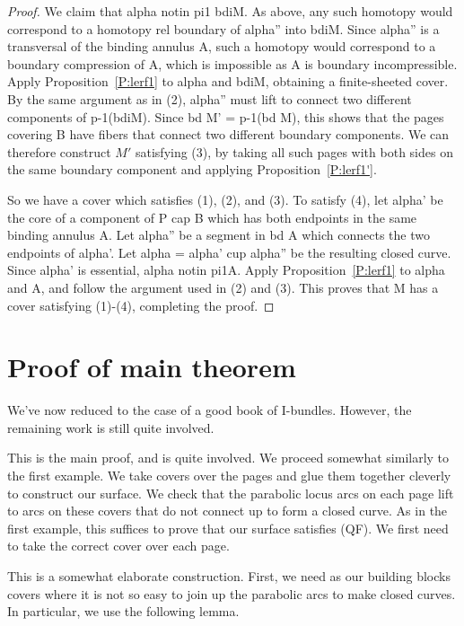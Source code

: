 \begin{proof}
We claim that alpha notin pi1 bdiM. As above, any such homotopy would
correspond to a homotopy rel boundary of alpha'' into bdiM. Since alpha'' is
a transversal of the binding annulus A, such a homotopy would correspond to
a boundary compression of A, which is impossible as A is boundary
incompressible. Apply Proposition~\ref{P:lerf1} to alpha and bdiM, obtaining
a finite-sheeted cover. By the same argument as in (2), alpha'' must lift to
connect two different components of p-1(bdiM). Since bd M' = p-1(bd M), this
shows that the pages covering B have fibers that connect two different boundary
components. We can therefore construct $M'$ satisfying (3), by taking all such
pages with both sides on the same boundary component and applying
Proposition~\ref{P:lerf1'}.

So we have a cover which satisfies (1), (2), and (3). To satisfy (4), let
alpha' be the core of a component of P cap B which has both endpoints in the
same binding annulus A. Let alpha'' be a segment in bd A which connects the two
endpoints of alpha'. Let alpha = alpha' cup alpha'' be the resulting closed
curve. Since alpha' is essential, alpha notin pi1A. Apply
Proposition~\ref{P:lerf1} to alpha and A, and follow the argument used in (2)
and (3).  This proves that M has a cover satisfying (1)-(4), completing the
proof.

\end{proof}

\section{Proof of main theorem}

We've now reduced to the case of a good book of I-bundles. However, the
remaining work is still quite involved.

This is the main proof, and is quite involved. We proceed somewhat similarly to
the first example. We take covers over the pages and glue them together
cleverly to construct our surface. We check that the parabolic locus arcs on
each page lift to arcs on these covers that do not connect up to form a closed
curve. As in the first example, this suffices to prove that our surface
satisfies (QF). We first need to take the correct cover over each page.

This is a somewhat elaborate construction. First, we need as our building
blocks covers where it is not so easy to join up the parabolic arcs to make
closed curves. In particular, we use the following lemma.

